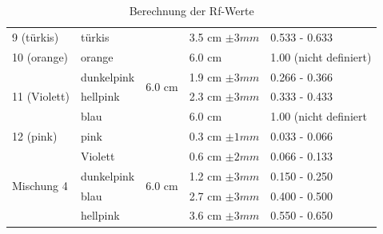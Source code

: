 \documentclass[11pt,paper=a4,final]{scrartcl}
\begin{document}
\begin{savenotes}
\begin{table}[ht!]
\begin{tabular}{|l|l|l|l|l|}
      9 (t\"urkis)	& t\"urkis	& \multirow{6}{*}{6.0 cm }	& 3.5 cm \(\pm 3 mm \)	& 0.533 - 0.633		\\ \cline{1-2} \cline{4-5}
       10 (orange)	& orange	& 				& 6.0 cm		& 1.00 (nicht definiert)\\ \cline{1-2} \cline{4-5}
      \multirow{3}{*}{11 (Violett)}
      			& dunkelpink	&				& 1.9 cm \(\pm 3 mm \)	& 0.266 - 0.366		\\
      			& hellpink	&				& 2.3 cm \(\pm 3 mm \)	& 0.333 - 0.433		\\
      			& blau		&				& 6.0 cm		& 1.00 (nicht definiert \\ \cline{1-2} \cline{4-5}
      12 (pink)		& pink		&				& 0.3 cm \(\pm 1 mm \)	& 0.033 - 0.066		\\ \hline
      \multirow{4}{*}{Mischung 4}
      			& Violett	& \multirow{4}{*}{6.0 cm }	& 0.6 cm \(\pm 2 mm \)	& 0.066 - 0.133		\\
      			& dunkelpink	&				& 1.2 cm \(\pm 3 mm \)	& 0.150 - 0.250		\\
			& blau		& 				& 2.7 cm \(\pm 3 mm \)	& 0.400 - 0.500		\\
      			& hellpink	& 				& 3.6 cm \(\pm 3 mm \)	& 0.550 - 0.650		\\ \hline
      	
    \end{tabular}
    \caption{Berechnung der Rf-Werte}
    \end{table}
\end{savenotes}
\end{document}
